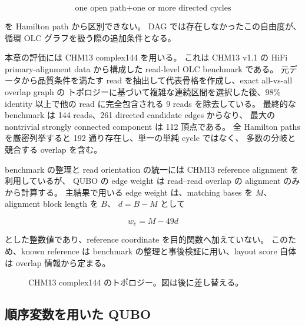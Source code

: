 \begin{equation}
\text{one open path}+\text{one or more directed cycles}
\label{eq:path_plus_cycles}
\end{equation}

を Hamilton path から区別できない。
DAG では存在しなかったこの自由度が、循環 OLC グラフを扱う際の追加条件となる。

本章の評価には CHM13 complex144 を用いる。
これは CHM13 v1.1 の HiFi primary-alignment data から構成した read-level OLC benchmark である。
元データから品質条件を満たす read を抽出して代表骨格を作成し、exact all-vs-all overlap graph の
トポロジーに基づいて複雑な連続区間を選択した後、98\% identity 以上で他の read に完全包含される
9 reads を除去している。
最終的な benchmark は 144 reads、261 directed candidate edges からなり、
最大の nontrivial strongly connected component は 112 頂点である。
全 Hamilton paths を厳密列挙すると 192 通り存在し、単一の単純 cycle ではなく、
多数の分岐と競合する overlap を含む。

benchmark の整理と read orientation の統一には CHM13 reference alignment を利用しているが、
QUBO の edge weight は read--read overlap の alignment のみから計算する。
主結果で用いる edge weight は、matching bases を $M$、alignment block length を $B$、
$d=B-M$ として

\begin{equation}
w_e=M-49d
\label{eq:complex144_weight}
\end{equation}

とした整数値であり、reference coordinate を目的関数へ加えていない。
このため、known reference は benchmark の整理と事後検証に用い、layout score 自体は overlap 情報から定まる。

\begin{figure}[tbp]
\centering
{}
\caption{CHM13 complex144 のトポロジー。図は後に差し替える。}
\label{fig:complex144_topology_placeholder}
\end{figure}

\subsection{順序変数を用いた QUBO}

